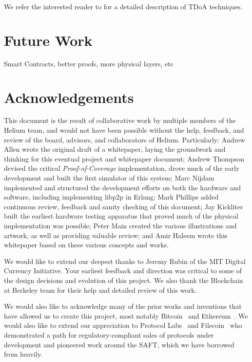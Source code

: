 \documentclass[letterpaper,11pt]{article}
\begin{document}
We refer the interested reader to\cite{tdoa} for a detailed description of TDoA techniques.

\newpage

\section{Future Work}

Smart Contracts, better proofs, more physical layers, etc

\newpage

\section{Acknowledgements}

This document is the result of collaborative work by multiple members of the Helium team, and would not have been possible without the help, feedback, and review of the board, advisors, and collaborators of Helium. Particularly: Andrew Allen wrote the original draft of a whitepaper, laying the groundwork and thinking for this eventual project and whitepaper document; Andrew Thompson devised the critical \emph{Proof-of-Coverage} implementation, drove much of the early development and built the first simulator of this system; Marc Nijdam implemented and structured the development efforts on both the hardware and software, including implementing libp2p in Erlang; Mark Phillips added continuous review, feedback and sanity checking of this document; Jay Kickliter built the earliest hardware testing apparatus that proved much of the physical implementation was possible; Peter Main created the various illustrations and artwork, as well as providing valuable review; and Amir Haleem wrote this whitepaper based on these various concepts and works.

We would like to extend our deepest thanks to Jeremy Rubin of the MIT Digital Currency Initiative. Your earliest feedback and direction was critical to some of the design decisions and evolution of this project. We also thank the Blockchain at Berkeley team for their help and detailed review of this work.

We would also like to acknowledge many of the prior works and inventions that have allowed us to create this project, most notably Bitcoin~\cite{bitcoin} and Ethereum~\cite{ethereum}. We would also like to extend our appreciation to Protocol Labs~\cite{protocol} and Filecoin~\cite{filecoin} who demonstrated a path for regulatory-compliant sales of protocols under development and pioneered work around the SAFT, which we have borrowed from heavily.
\newpage
\end{document}
